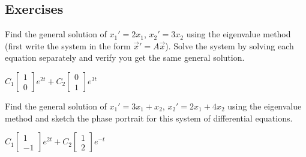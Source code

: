 \subsection{Exercises}

\begin{exercise}
\leavevmode
\begin{tasks}
\task
Find the general solution of $x_1' = 2 x_1$, $x_2' = 3 x_2$ using the
eigenvalue method (first write the system in the form
${\vec{x}}' = A \vec{x}$).
\task
Solve the system by solving each equation
separately and verify you get the same general solution.
\end{tasks}
\end{exercise}
\comboSol{%
}
{%
$C_1\left[\begin{smallmatrix} 1 \\ 0 \end{smallmatrix}\right]e^{2t} + C_2\left[\begin{smallmatrix} 0 \\ 1  \end{smallmatrix}\right]e^{3t}$
}

\begin{exercise}
Find the general solution of $x_1' = 3 x_1 + x_2$,
$x_2' = 2 x_1 + 4 x_2$ using the eigenvalue method and sketch the phase portrait for this system of differential equations.
\end{exercise}
\comboSol{%
}
{%
$C_1 \left[\begin{smallmatrix} 1 \\ -1 \end{smallmatrix}\right]e^{2t} + C_2\left[\begin{smallmatrix} 1 \\ 2 \end{smallmatrix}\right]e^{-t}$ \hfill
{} \hfill \hfill
}

